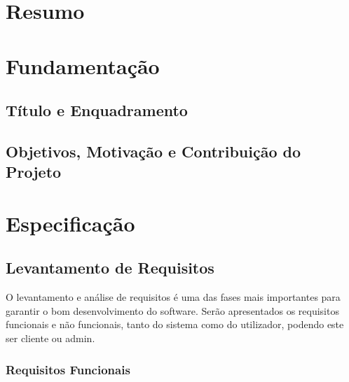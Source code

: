 \documentclass[
  oneside,
  11pt, a4paper,
  footinclude=true,
  headinclude=true,
  cleardoublepage=empty
]{scrbook}
\author{}
\date{\myear} %
\begin{document}
	\umfrontcover	
	\umtitlepage
	

	\chapter*{Resumo}
	
	
	
	\tableofcontents
	\listoffigures
	\printglossary[type=\acronymtype]
	\clearpage
	\thispagestyle{empty}

	
	
	\chapter{Fundamentação}
        \section{Título e Enquadramento}
        
        \section{Objetivos, Motivação e Contribuição do Projeto}
        
		

	\chapter{Especificação}
        \section{Levantamento de Requisitos}
        O levantamento e análise de requisitos é uma das fases mais importantes para garantir o bom desenvolvimento do software.
        Serão apresentados os requisitos funcionais e não funcionais, tanto do sistema como do utilizador, podendo este ser cliente ou admin.
        
        \subsection{Requisitos Funcionais}
\end{document}
